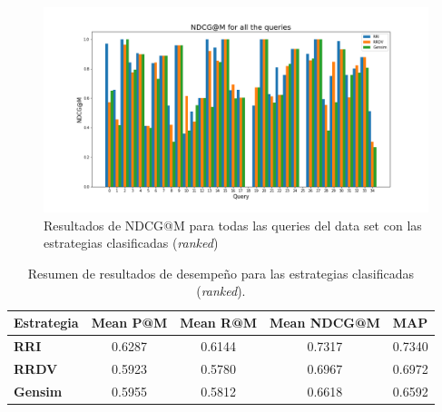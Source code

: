 \begin{figure}[H]
    \centering
    \includegraphics[width=\textwidth]{doc/images/NDCG@M_Ranked.png}
    \caption{Resultados de NDCG@M para todas las queries del data set con las estrategias clasificadas (\textit{ranked})}
    \label{fig:my_label}
\end{figure}


\begin{table}[H]
\centering
\label{tab:rankedResults}
\begin{tabular}{|l|c|c|c|c|}
\hline
\textbf{Estrategia} & \multicolumn{1}{l|}{\textbf{Mean P@M}} & \multicolumn{1}{l|}{\textbf{Mean R@M}} & \multicolumn{1}{l|}{\textbf{Mean NDCG@M}} & \multicolumn{1}{l|}{\textbf{MAP}} \\ \hline
\textbf{RRI} & 0.6287 & 0.6144 & 0.7317 & 0.7340 \\ \hline
\textbf{RRDV} & 0.5923 & 0.5780 & 0.6967 & 0.6972 \\ \hline
\textbf{Gensim} & 0.5955 & 0.5812 & 0.6618 & 0.6592 \\ \hline
\end{tabular}
\caption{Resumen de resultados de desempeño para las estrategias clasificadas (\textit{ranked}).}
\end{table}

